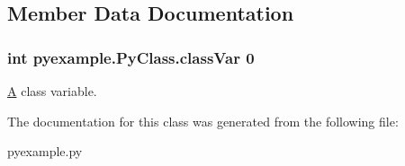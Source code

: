 \subsection{Member Data Documentation}
\hypertarget{classpyexample_1_1_py_class_abd17aff54e5b0ca194020c796c733546}{
\subsubsection[{class\-Var}]{\setlength{\rightskip}{0pt plus 5cm}int pyexample.\-Py\-Class.\-class\-Var 0\hspace{0.3cm}{\ttfamily [static]}}}\label{classpyexample_1_1_py_class_abd17aff54e5b0ca194020c796c733546}


\hyperlink{class_a}{A} class variable. 



The documentation for this class was generated from the following file\-:\begin{DoxyCompactItemize}
\item 
pyexample.\-py\end{DoxyCompactItemize}
